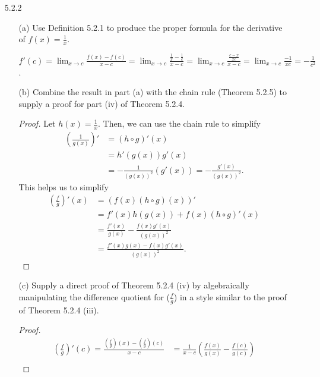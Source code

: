 \documentclass[12pt,letterpaper]{article}
\begin{document}
    \begin{itemize}[leftmargin=!,labelindent=5pt]
        \item [5.2.2] 
            \begin{itemize}
                \item [(a)] Use Definition 5.2.1 to produce the proper formula for the derivative of $f(x) = \frac{1}{x}$.
                    
                    $f'(c) = \lim_{x\to c} \frac{f(x) - f(c)}{x-c} = \lim_{x \to c} \frac{\frac{1}{x} - \frac{1}{c}}{x-c} = \lim_{x\to c} \frac{\frac{c-x}{xc}}{x-c} = \lim_{x \to c} \frac{-1}{xc} = -\frac{1}{c^2}$.
                \item [(b)] Combine the result in part (a) with the chain rule (Theorem 5.2.5) to supply a proof for part (iv) of Theorem 5.2.4.
                    \begin{proof}
                        Let $h(x) = \frac{1}{x}$.
                        Then, we can use the chain rule to simplify
                        \begin{align*}
                            (\frac{1}{g(x)})' &= (h \circ g)'(x) \\
                            &= h'(g(x))g'(x) \\
                            &= -\frac{1}{(g(x))^2}(g'(x)) = -\frac{g'(x)}{(g(x))^2}.
                        \end{align*}
                        This helps us to simplify 
                        \begin{align*}
                            (\frac{f}{g})'(x) &= (f(x)(h \circ g)(x))' \\
                            &= f'(x)h(g(x)) + f(x)(h \circ g)'(x) \\
                            &= \frac{f'(x)}{g(x)} - \frac{f(x)g'(x)}{(g(x))^2}\\
                            &= \frac{f'(x)g(x) - f(x)g'(x)}{(g(x))^2}.
                        \end{align*}
                    \end{proof}
                \item [(c)] Supply a direct proof of Theorem 5.2.4 (iv) by algebraically manipulating the difference quotient for ($\frac{f}{g}$) in a style similar to the proof of Theorem 5.2.4 (iii).
                    \begin{proof}
                        \begin{align*}
                            (\frac{f}{g})'(c) = \frac{(\frac{f}{g})(x) - (\frac{f}{g})(c)}{x-c} &= \frac{1}{x-c} (\frac{f(x)}{g(x)} - \frac{f(c)}{g(c)})\\

\end{align*}
\end{proof}
\end{itemize}
\end{itemize}
\end{document}
